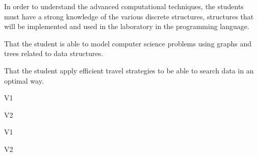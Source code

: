 \begin{syllabus}


\begin{justification}
In order to understand the advanced computational techniques, the students must have a strong knowledge of the
various discrete structures, structures that will be implemented and used in the laboratory in the programming language.
\end{justification}

\begin{goals}
\item That the student is able to model computer science problems using graphs and trees related to data structures.
\item That the student apply efficient travel strategies to be able to search data in an optimal way.
\end{goals}

\begin{outcomes}{V1}
    \item {} 
    \item {} 
    \item {} 
    \item {} 
    \item {} 
\end{outcomes}

\begin{outcomes}{V2}
    \item {} 
    \item {} 
\end{outcomes}

\begin{competences}{V1}
    \item {}
    \item {}
    \item {}
    \item {}
    \item {}
    \item {}
\end{competences}

\begin{competences}{V2}
    \item {}
    \item {}
    \item {}
    \item {}
    \item {}
    \item {}
\end{competences}


\end{syllabus}
